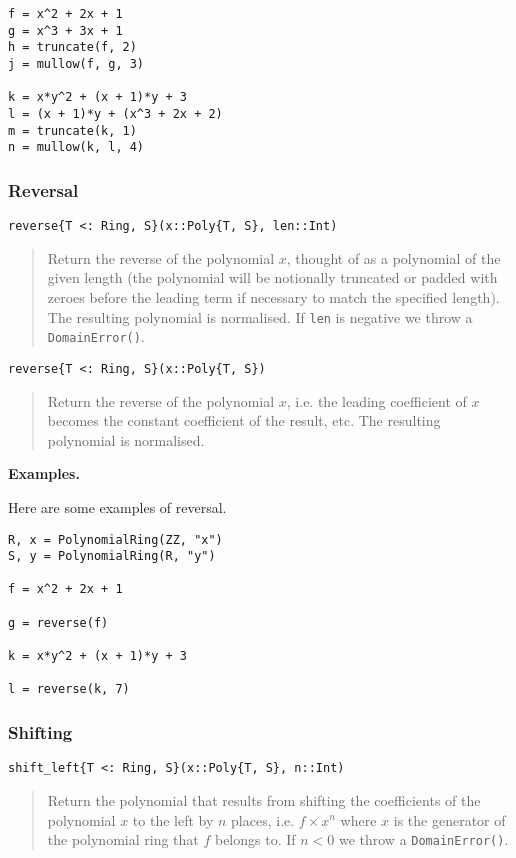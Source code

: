 \documentclass[a4paper,10pt]{article}
\newcommand{\code}{\lstinline}
\newcommand{\desc}[1]{\vspace{-3mm}\begin{quote}#1\end{quote}}
\begin{document}
{{{\begin{lstlisting}
f = x^2 + 2x + 1
g = x^3 + 3x + 1
h = truncate(f, 2)
j = mullow(f, g, 3)

k = x*y^2 + (x + 1)*y + 3
l = (x + 1)*y + (x^3 + 2x + 2)
m = truncate(k, 1)
n = mullow(k, l, 4)
\end{lstlisting}

\subsubsection{Reversal}

\begin{lstlisting}
reverse{T <: Ring, S}(x::Poly{T, S}, len::Int)
\end{lstlisting}

\desc{Return the reverse of the polynomial $x$, thought of as a polynomial of
the given length (the polynomial will be notionally truncated or padded with
zeroes before the leading term if necessary to match the specified length). 
The resulting polynomial is normalised. If \code{len} is negative we throw a
\code{DomainError()}.}

\begin{lstlisting}
reverse{T <: Ring, S}(x::Poly{T, S})
\end{lstlisting}

\desc{Return the reverse of the polynomial $x$, i.e. the leading coefficient
of $x$ becomes the constant coefficient of the result, etc. The resulting
polynomial is normalised.}

\textbf{Examples.}

Here are some examples of reversal.

\begin{lstlisting}
R, x = PolynomialRing(ZZ, "x")
S, y = PolynomialRing(R, "y")

f = x^2 + 2x + 1

g = reverse(f)

k = x*y^2 + (x + 1)*y + 3

l = reverse(k, 7)
\end{lstlisting}

\subsubsection{Shifting}

\begin{lstlisting}
shift_left{T <: Ring, S}(x::Poly{T, S}, n::Int)
\end{lstlisting}

\desc{Return the polynomial that results from shifting the coefficients of the
polynomial $x$ to the left by $n$ places, i.e. $f\times x^n$ where $x$ is the
generator of the polynomial ring that $f$ belongs to. If $n < 0$ we throw a
\code{DomainError()}.}

}}}
\end{document}
